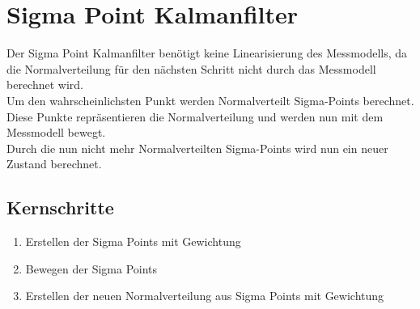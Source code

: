 \chapter{Sigma Point Kalmanfilter}
\label{chp:sigmaPointKalmanfilter}

Der Sigma Point Kalmanfilter benötigt keine Linearisierung des Messmodells, da die Normalverteilung für den nächsten Schritt nicht durch das Messmodell berechnet wird.\\
Um den wahrscheinlichsten Punkt werden Normalverteilt Sigma-Points berechnet. Diese Punkte repräsentieren die Normalverteilung und werden nun mit dem Messmodell bewegt. \\
Durch die nun nicht mehr Normalverteilten Sigma-Points wird nun ein neuer Zustand berechnet.

\section{Kernschritte}
\begin{enumerate}
	\item Erstellen der Sigma Points mit Gewichtung
	\item Bewegen der Sigma Points 
	\item Erstellen der neuen Normalverteilung aus Sigma Points mit Gewichtung
\end{enumerate}